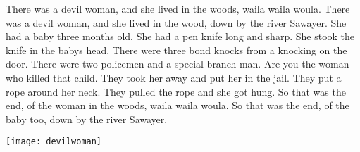 \beginverse*
There was a devil woman, 
and she lived in the woods,
waila waila woula.
There was a devil woman,
and she lived in the wood,
down by the river Sawayer.
\endverse
\beginverse*
She had a baby three months old.
\endverse
\beginverse*
She had a pen knife long and sharp.
\endverse
\beginverse*
She stook the knife in the babys head.
\endverse
\beginverse*
There were three bond knocks from a knocking on the door.
\endverse
\beginverse*
There were two policemen and a special-branch man.
\endverse
\beginverse*
Are you the woman who killed that child.
\endverse
\beginverse*
They took her away and put her in the jail.
\endverse
\beginverse*
They put a rope around her neck.
\endverse
\beginverse*
They pulled the rope and she got hung.
\endverse
\beginverse*
So that was the end,
of the woman in the woods,
waila waila woula.
So that was the end,
of the baby too,
down by the river Sawayer.
\endverse
\endsong
\begin{intersong}
	\begin{center}
		\texttt{[image: devilwoman]}
	\end{center}
\end{intersong}